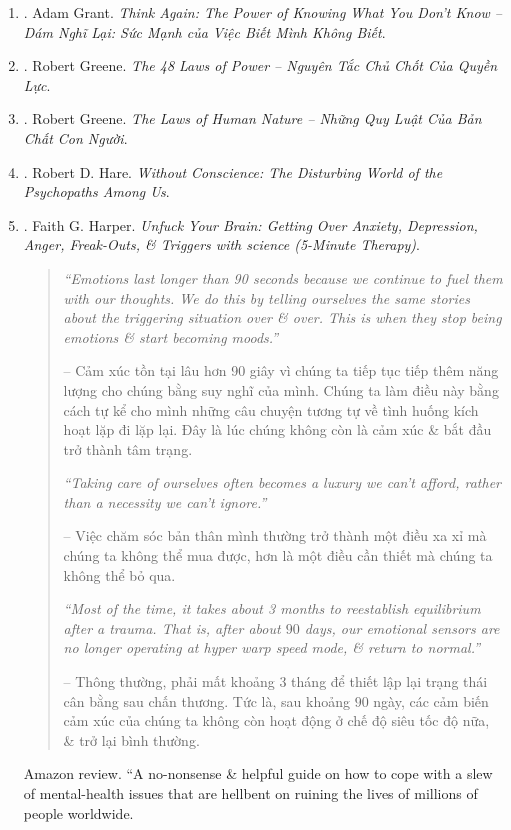 \documentclass{article}
\begin{document}
\begin{enumerate}
	\item \cite{Grant2022b}. Adam Grant. {\it Think Again: The Power of Knowing What You Don't Know -- Dám Nghĩ Lại: Sức Mạnh của Việc Biết Mình Không Biết}.\hfill{\sf[done]}
	\item \cite{Greene_laws_power}. Robert Greene. {\it The 48 Laws of Power -- Nguyên Tắc Chủ Chốt Của Quyền Lực}.\hfill{\sf[done]}
	\item \cite{Greene_laws_human_nature}. Robert Greene. {\it The Laws of Human Nature -- Những Quy Luật Của Bản Chất Con Người}.\hfill{\sf[done]}
	\item \cite{Hare1999}. Robert D. Hare. {\it Without Conscience: The Disturbing World of the Psychopaths Among Us}.\hfill{\sf[reading]}
	\item \cite{Harper_unfuck_brain}. {\sc Faith G. Harper}. {\it Unfuck Your Brain: Getting Over Anxiety, Depression, Anger, Freak-Outs, \& Triggers with science (5-Minute Therapy)}.
	\begin{quotation}
		{\it``Emotions last longer than 90 seconds because we continue to fuel them with our thoughts. We do this by telling ourselves the same stories about the triggering situation over \& over. This is when they stop being emotions \& start becoming moods.''}
		
		-- Cảm xúc tồn tại lâu hơn 90 giây vì chúng ta tiếp tục tiếp thêm năng lượng cho chúng bằng suy nghĩ của mình. Chúng ta làm điều này bằng cách tự kể cho mình những câu chuyện tương tự về tình huống kích hoạt lặp đi lặp lại. Đây là lúc chúng không còn là cảm xúc \& bắt đầu trở thành tâm trạng.
		
		{\it``Taking care of {\sc ourselves} often becomes a luxury we can't afford, rather than a necessity we can't ignore.''}
		
		-- Việc chăm sóc {\sc bản thân mình} thường trở thành một điều xa xỉ mà chúng ta không thể mua được, hơn là một điều cần thiết mà chúng ta không thể bỏ qua.
		
		{\it``Most of the time, it takes about 3 months to reestablish equilibrium after a trauma. That is, after about $90$ days, our emotional sensors are no longer operating at hyper warp speed mode, \& return to normal.''}
		
		-- Thông thường, phải mất khoảng 3 tháng để thiết lập lại trạng thái cân bằng sau chấn thương. Tức là, sau khoảng $90$ ngày, các cảm biến cảm xúc của chúng ta không còn hoạt động ở chế độ siêu tốc độ nữa, \& trở lại bình thường.
	\end{quotation}
	{\sf Amazon review.} ``A no-nonsense \& helpful guide on how to cope with a slew of mental-health issues that are hellbent on ruining the lives of millions of people worldwide.
	

\end{enumerate}
\end{document}
